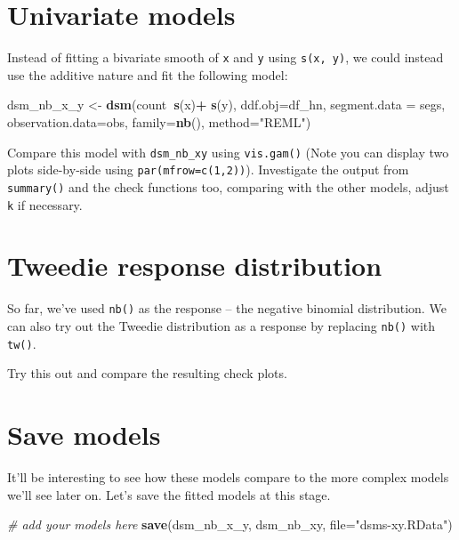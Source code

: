 \documentclass[]{book}
\newenvironment{Shaded}{\begin{snugshade}}{\end{snugshade}}
\newcommand{\KeywordTok}[1]{\textcolor[rgb]{0.13,0.29,0.53}{\textbf{#1}}}
\newcommand{\DataTypeTok}[1]{\textcolor[rgb]{0.13,0.29,0.53}{#1}}
\newcommand{\StringTok}[1]{\textcolor[rgb]{0.31,0.60,0.02}{#1}}
\newcommand{\CommentTok}[1]{\textcolor[rgb]{0.56,0.35,0.01}{\textit{#1}}}
\newcommand{\OperatorTok}[1]{\textcolor[rgb]{0.81,0.36,0.00}{\textbf{#1}}}
\newcommand{\NormalTok}[1]{#1}
\theoremstyle{definition}
\theoremstyle{definition}
\theoremstyle{remark}
\begin{document}
\section{Univariate models}\label{univariate-models}

Instead of fitting a bivariate smooth of \texttt{x} and \texttt{y} using
\texttt{s(x,\ y)}, we could instead use the additive nature and fit the
following model:

\begin{Shaded}
\begin{Highlighting}[]
\NormalTok{dsm_nb_x_y <-}\StringTok{ }\KeywordTok{dsm}\NormalTok{(count}\OperatorTok{~}\KeywordTok{s}\NormalTok{(x)}\OperatorTok{+}\StringTok{ }\KeywordTok{s}\NormalTok{(y),}
                 \DataTypeTok{ddf.obj=}\NormalTok{df_hn, }\DataTypeTok{segment.data =}\NormalTok{ segs, }\DataTypeTok{observation.data=}\NormalTok{obs,}
                 \DataTypeTok{family=}\KeywordTok{nb}\NormalTok{(), }\DataTypeTok{method=}\StringTok{"REML"}\NormalTok{)}
\end{Highlighting}
\end{Shaded}

Compare this model with \texttt{dsm\_nb\_xy} using \texttt{vis.gam()}
(Note you can display two plots side-by-side using
\texttt{par(mfrow=c(1,2))}). Investigate the output from
\texttt{summary()} and the check functions too, comparing with the other
models, adjust \texttt{k} if necessary.

\section{Tweedie response
distribution}\label{tweedie-response-distribution}

So far, we've used \texttt{nb()} as the response -- the negative
binomial distribution. We can also try out the Tweedie distribution as a
response by replacing \texttt{nb()} with \texttt{tw()}.

Try this out and compare the resulting check plots.

\section{Save models}\label{save-models}

It'll be interesting to see how these models compare to the more complex
models we'll see later on. Let's save the fitted models at this stage.

\begin{Shaded}
\begin{Highlighting}[]
\CommentTok{# add your models here}
\KeywordTok{save}\NormalTok{(dsm_nb_x_y, dsm_nb_xy,}
     \DataTypeTok{file=}\StringTok{"dsms-xy.RData"}\NormalTok{)}
\end{Highlighting}
\end{Shaded}
\end{document}
